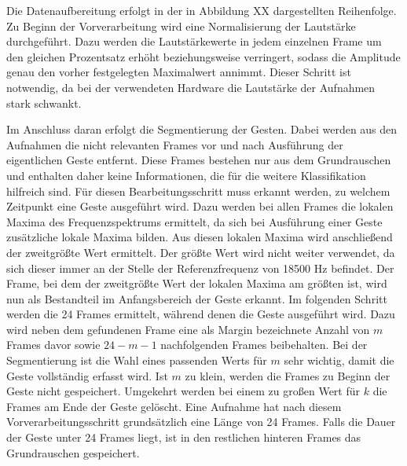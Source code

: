 



Die Datenaufbereitung erfolgt in der in Abbildung XX dargestellten Reihenfolge. 
Zu Beginn der Vorverarbeitung wird eine Normalisierung der 
Lautstärke durchgeführt. Dazu werden die Lautstärkewerte in jedem einzelnen Frame um den gleichen Prozentsatz erhöht beziehungsweise verringert, sodass die Amplitude genau den vorher festgelegten Maximalwert annimmt. Dieser Schritt ist notwendig, da bei der verwendeten Hardware die Lautstärke der Aufnahmen stark schwankt.

Im Anschluss daran erfolgt die Segmentierung der Gesten. Dabei werden aus den Aufnahmen die nicht relevanten Frames vor und nach Ausführung der eigentlichen Geste entfernt. Diese Frames bestehen nur aus dem Grundrauschen und enthalten daher keine Informationen, die für die weitere Klassifikation hilfreich sind.
Für diesen Bearbeitungsschritt muss erkannt werden, zu welchem Zeitpunkt eine Geste ausgeführt wird. Dazu werden bei allen Frames die lokalen Maxima des Frequenzspektrums ermittelt, da sich bei Ausführung einer Geste zusätzliche lokale Maxima bilden.
Aus diesen lokalen Maxima wird anschließend der zweitgrößte Wert ermittelt. Der größte Wert wird nicht weiter verwendet, da sich dieser immer an der Stelle der Referenzfrequenz von 18500 Hz befindet. 
Der Frame, bei dem der zweitgrößte Wert der lokalen Maxima am größten ist, wird nun als Bestandteil im Anfangsbereich der Geste erkannt. 
Im folgenden Schritt werden die 24 Frames ermittelt, während denen die Geste ausgeführt wird. 
Dazu wird neben dem gefundenen Frame eine als Margin bezeichnete Anzahl von $m$ Frames davor sowie $24-m-1$ nachfolgenden Frames beibehalten. Bei der Segmentierung ist die Wahl eines passenden Werts für $m$ sehr wichtig, damit die Geste vollständig erfasst wird. Ist $m$ zu klein, werden die Frames zu Beginn der Geste nicht gespeichert. Umgekehrt werden bei einem zu großen Wert für $k$ die Frames am Ende der Geste gelöscht. Eine Aufnahme hat nach diesem Vorverarbeitungsschritt grundsätzlich eine Länge von 24 Frames. Falls die Dauer der Geste unter 24 Frames liegt, ist in den restlichen hinteren Frames das Grundrauschen gespeichert.

